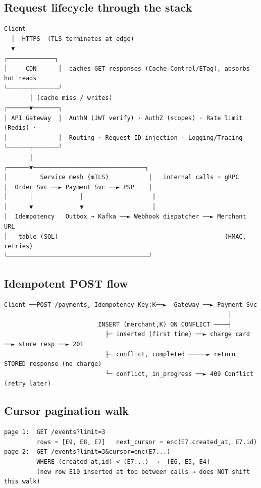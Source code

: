 \documentclass[11pt]{article}
\begin{document}
\subsection{Request lifecycle through the stack}\label{request-lifecycle-through-the-stack}

\setcodelang{}

\begin{verbatim}
Client
  │  HTTPS  (TLS terminates at edge)
  ▼
┌─────────────┐
│     CDN      │  caches GET responses (Cache-Control/ETag), absorbs hot reads
└──────┬───────┘
       │ (cache miss / writes)
┌──────▼───────┐
│ API Gateway  │  AuthN (JWT verify) · AuthZ (scopes) · Rate limit (Redis) ·
│              │  Routing · Request-ID injection · Logging/Tracing
└──────┬───────┘
       │
┌──────▼───────────────────────────────┐
│         Service mesh (mTLS)           │   internal calls = gRPC
│  Order Svc ──► Payment Svc ──► PSP    │
│      │             │                   │
│      ▼             ▼                   │
│  Idempotency   Outbox → Kafka ──► Webhook dispatcher ──► Merchant URL
│   table (SQL)                                              (HMAC, retries)
└───────────────────────────────────────┘
\end{verbatim}

\subsection{Idempotent POST flow}\label{idempotent-post-flow}

\setcodelang{}

\begin{verbatim}
Client ──POST /payments, Idempotency-Key:K──►  Gateway ──► Payment Svc
                                                              │
                          INSERT (merchant,K) ON CONFLICT ────┤
                            ├─ inserted (first time) ──► charge card ──► store resp ──► 201
                            ├─ conflict, completed ─────► return STORED response (no charge)
                            └─ conflict, in_progress ──► 409 Conflict (retry later)
\end{verbatim}

\subsection{Cursor pagination walk}\label{cursor-pagination-walk}

\setcodelang{}

\begin{verbatim}
page 1:  GET /events?limit=3
         rows = [E9, E8, E7]   next_cursor = enc(E7.created_at, E7.id)
page 2:  GET /events?limit=3&cursor=enc(E7...)
         WHERE (created_at,id) < (E7...)  →  [E6, E5, E4]
         (new row E10 inserted at top between calls → does NOT shift this walk)
\end{verbatim}
\end{document}
